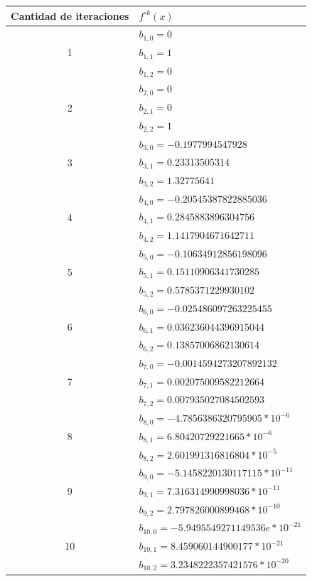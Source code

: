 \documentclass[oneside,11pt]{book}
\theoremstyle{definition}
\theoremstyle{plain}
\theoremstyle{remark}
\begin{document}
\begin{center}
\begin{tabular}{ | c | l | }
\hline
 Cantidad de iteraciones & $f^{\circ k}(x)$ \\
 \hline 
& $b_{1,0}= 0$ \\
1 & $b_{1,1}= 1$   \\ 
& $b_{1,2}= 0$ \\  
 \hline 
& $b_{2,0}= 0$ \\
2 & $b_{2,1}= 0$ \\ 
& $b_{2,2}= 1$\\
\hline
& $b_{3,0}= -0.1977994547928$ \\
3 & $b_{3,1}= 0.23313505314$ \\ 
& $b_{3,2}= 1.32775641$ \\
\hline
& $b_{4,0}= -0.20545387822885036$ \\
4 & $b_{4,1}= 0.2845883896304756$   \\ 
& $b_{4,2}= 1.1417904671642711$ \\
\hline
& $b_{5,0}= -0.10634912856198096$ \\
5 & $b_{5,1}= 0.15110906341730285$  \\ 
& $b_{5,2}= 0.5785371229930102$ \\
\hline
& $b_{6,0}= -0.025486097263225455$ \\
6 & $b_{6,1}= 0.036236044396915044$ \\ 
& $b_{6,2}= 0.13857006862130614$ \\
\hline
& $b_{7,0}= -0.0014594273207892132$ \\
7 & $b_{7,1}= 0.002075009582212664$  \\ 
& $b_{7,2}= 0.007935027084502593$ \\
\hline
& $b_{8,0}= -4.7856386320795905*10^{-6}$ \\
8 & $b_{8,1}= 6.80420729221665*10^{-6}$  \\ 
& $b_{8,2}= 2.601991316816804*10^{-5}$ \\
\hline
& $b_{9,0}= -5.1458220130117115*10^{-11}$ \\
9 & $b_{9,1}= 7.316314990998036*10^{-11}$  \\ 
& $b_{9,2}= 2.797826000899468*10^{-10}$ \\
\hline
& $b_{10,0}= -5.9495549271149536e*10^{-21}$ \\
10 & $b_{10,1}= 8.459060144900177*10^{-21}$  \\ 
& $b_{10,2}= 3.2348222357421576*10^{-20}$\\
\hline
\end{tabular}
\end{center}
\end{document}
